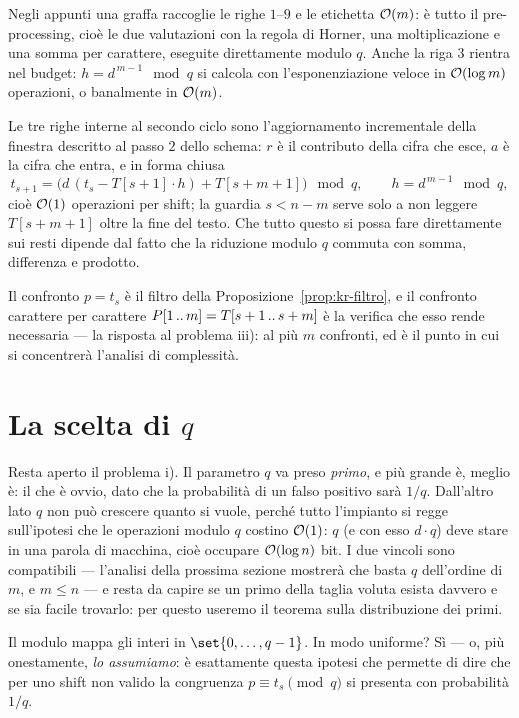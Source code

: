 Negli appunti una graffa raccoglie le righe $1$--$9$ e le etichetta $\mathcal{O}(m)$: è tutto il
pre-processing, cioè le due valutazioni con la regola di Horner, una moltiplicazione e una
somma per carattere, eseguite direttamente modulo $q$. Anche la riga $3$ rientra nel budget:
$h = d^{\,m-1} \mod q$ si calcola con l'esponenziazione veloce in $\mathcal{O}(\log m)$ operazioni, o
banalmente in $\mathcal{O}(m)$.

Le tre righe interne al secondo ciclo sono l'aggiornamento incrementale della finestra
descritto al passo $2$ dello schema: $r$ è il contributo della cifra che esce, $a$ è la cifra
che entra, e in forma chiusa
\[
  t_{s+1} = \bigl(d\,(t_s - T[s+1]\cdot h) + T[s+m+1]\bigr) \mod q,
  \qquad h = d^{\,m-1} \mod q,
\]
cioè $\mathcal{O}(1)$ operazioni per shift; la guardia $s < n-m$ serve solo a non leggere $T[s+m+1]$
oltre la fine del testo. Che tutto questo si possa fare direttamente sui resti dipende dal
fatto che la riduzione modulo $q$ commuta con somma, differenza e prodotto.

Il confronto $p = t_s$ è il filtro della Proposizione~\ref{prop:kr-filtro}, e il confronto
carattere per carattere $P[1\,..\,m] = T[s+1\,..\,s+m]$ è la verifica che esso rende
necessaria --- la risposta al problema iii): al più $m$ confronti, ed è il punto in cui si
concentrerà l'analisi di complessità.

\section{La scelta di \texorpdfstring{$q$}{q}}

Resta aperto il problema i). Il parametro $q$ va preso \emph{primo}, e più grande è, meglio
è: il che è ovvio, dato che la probabilità di un falso positivo sarà $1/q$. Dall'altro lato
$q$ non può crescere quanto si vuole, perché tutto l'impianto si regge sull'ipotesi che le
operazioni modulo $q$ costino $\mathcal{O}(1)$: $q$ (e con esso $d\cdot q$) deve stare in una parola
di macchina, cioè occupare $\mathcal{O}(\log n)$ bit. I due vincoli sono compatibili --- l'analisi
della prossima sezione mostrerà che basta $q$ dell'ordine di $m$, e $m \le n$ --- e resta da
capire se un primo della taglia voluta esista davvero e se sia facile trovarlo: per questo
useremo il teorema sulla distribuzione dei primi.

Il modulo mappa gli interi in $\set{0,\dots,q-1}$. In modo uniforme? Sì --- o, più
onestamente, \emph{lo assumiamo}: è esattamente questa ipotesi che permette di dire che per
uno shift non valido la congruenza $p \equiv t_s \pmod{q}$ si presenta con probabilità $1/q$.

